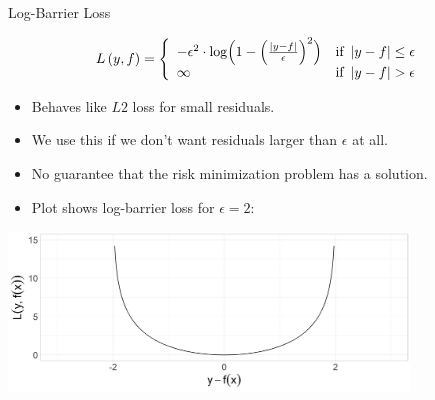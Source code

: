 \documentclass[11pt,compress,t,notes=noshow, xcolor=table]{beamer}
\begin{document}
\begin{vbframe}{Log-Barrier Loss}

\begin{small}
\[
  L\left(y, f\right) = \left\{\begin{array}{lr}
        -\epsilon^{2} \cdot \log \Bigl( 1 - \Bigl(\frac{\left|y - f\right|}{\epsilon}\Bigr)^2 \Bigr) & \text{if } \left|y-f\right| \leq \epsilon \\
        \infty & \text{if } \left|y-f\right|  > \epsilon
        \end{array}\right.
  \]
\end{small}

\begin{itemize}
\item Behaves like $L2$ loss for small residuals.
\item We use this if we don't want residuals larger than $\epsilon$ at all.
\item No guarantee that the risk minimization problem has a solution.
\item Plot shows log-barrier loss for $\epsilon=2$:
\end{itemize}

\begin{center}
\includegraphics[width = 0.8\textwidth]{figure/loss_logbarrier_1.png}
\end{center}


\end{vbframe}
\end{document}
